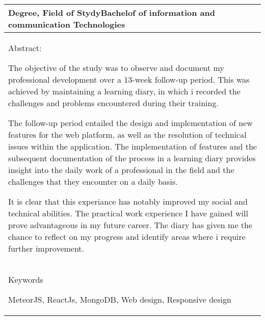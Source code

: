 \begin{tabular}{ | l | }
    \begin{minipage}[t][1.5cm][t]{10cm}
    Degree, Field of Stydy\newline  Bachelof of information and communication Technologies

    \end{minipage}\\ \hline

    \begin{minipage}[t][7.5cm][t]{14.5cm}
    Abstract: \medskip 

    The objective of the study was to observe and document my professional development over a 13-week follow-up period.
        This was achieved by maintaining a learning diary, 
        in which i recorded the challenges and problems encountered during their training. \medskip

    The follow-up period entailed the design and implementation of new features for the web platform,
        as well as the resolution of technical issues within the application.
        The implementation of features and the subsequent documentation of the process in a learning diary provides insight into the daily work of a professional in the field and the challenges that they encounter on a daily basis. \medskip

    It is clear that this experiance has notably improved my social and technical abilities. 
        The practical work experience I have gained will prove advantageous in my future career.
        The diary has given me the chance to reflect on my progress and identify areas where i require further improvement.

    \end{minipage}\\ \hline

    \begin{minipage}[t][2cm][t]{14cm}
        Keywords
        \medskip

        MeteorJS, ReactJs, MongoDB, Web design, Responsive design 
    \end{minipage}\\ \hline

\end{tabular}
